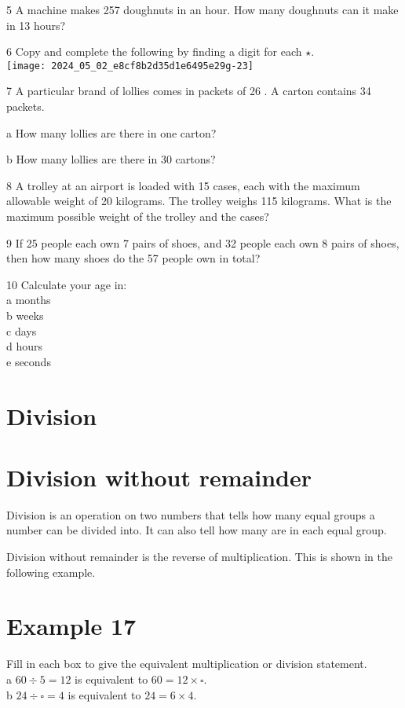 \documentclass[10pt]{article}
\begin{document}
5 A machine makes 257 doughnuts in an hour. How many doughnuts can it make in 13 hours?

6 Copy and complete the following by finding a digit for each \(\star\).\\
\texttt{[image: 2024\_05\_02\_e8cf8b2d35d1e6495e29g-23]}

7 A particular brand of lollies comes in packets of 26 . A carton contains 34 packets.

a How many lollies are there in one carton?

b How many lollies are there in 30 cartons?

8 A trolley at an airport is loaded with 15 cases, each with the maximum allowable weight of 20 kilograms. The trolley weighs 115 kilograms. What is the maximum possible weight of the trolley and the cases?

9 If 25 people each own 7 pairs of shoes, and 32 people each own 8 pairs of shoes, then how many shoes do the 57 people own in total?

10 Calculate your age in:\\
a months\\
b weeks\\
c days\\
d hours\\
e seconds

\section*{Division}
\section*{Division without remainder}
Division is an operation on two numbers that tells how many equal groups a number can be divided into. It can also tell how many are in each equal group.

Division without remainder is the reverse of multiplication. This is shown in the following example.

\section*{Example 17}
Fill in each box to give the equivalent multiplication or division statement.\\
a \(60 \div 5=12\) is equivalent to \(60=12 \times \square\).\\
b \(24 \div \square=4\) is equivalent to \(24=6 \times 4\).
\end{document}
